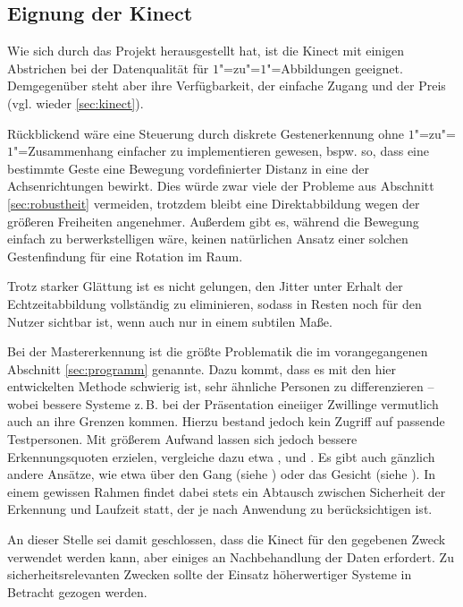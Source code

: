 \subsection{Eignung der Kinect}
Wie sich durch das Projekt herausgestellt hat, ist die Kinect mit einigen Abstrichen bei der Datenqualität für $1$"=zu"=$1$"=Abbildungen geeignet. Demgegenüber steht aber ihre Verfügbarkeit, der einfache Zugang und der Preis (vgl. wieder \ref{sec:kinect}).\par 
Rückblickend wäre eine Steuerung durch diskrete Gestenerkennung ohne $1$"=zu"=$1$"=Zusammenhang einfacher zu implementieren gewesen, bspw. so, dass eine bestimmte Geste eine Bewegung vordefinierter Distanz in eine der Achsenrichtungen bewirkt. Dies würde zwar viele der Probleme aus Abschnitt \ref{sec:robustheit} vermeiden, trotzdem bleibt eine Direktabbildung wegen der größeren Freiheiten angenehmer. Außerdem gibt es, während die Bewegung einfach zu berwerkstelligen wäre, keinen natürlichen Ansatz einer solchen Gestenfindung für eine Rotation im Raum.\par 
Trotz starker Glättung ist es nicht gelungen, den Jitter unter Erhalt der Echtzeitabbildung vollständig zu eliminieren, sodass in Resten noch für den Nutzer sichtbar ist, wenn auch nur in einem subtilen Maße.\par 
Bei der Mastererkennung ist die größte Problematik die im vorangegangenen Abschnitt \ref{sec:programm} genannte. Dazu kommt, dass es mit den hier entwickelten Methode schwierig ist, sehr ähnliche Personen zu differenzieren -- wobei bessere Systeme z.\,B. bei der Präsentation eineiiger Zwillinge vermutlich auch an ihre Grenzen kommen. Hierzu bestand jedoch kein Zugriff auf passende Testpersonen. Mit größerem Aufwand lassen sich jedoch bessere Erkennungsquoten erzielen, vergleiche dazu etwa \cite{appearance}, \cite{biomid} und \cite{bodyprop}. Es gibt auch gänzlich andere Ansätze, wie etwa über den Gang (siehe \cite{gait}) oder das Gesicht (siehe \cite{face}). In einem gewissen Rahmen findet dabei stets ein Abtausch zwischen Sicherheit der Erkennung und Laufzeit statt, der je nach Anwendung zu berücksichtigen ist.\par 
An dieser Stelle sei damit geschlossen, dass die Kinect für den gegebenen Zweck verwendet werden kann, aber einiges an Nachbehandlung der Daten erfordert. Zu sicherheitsrelevanten Zwecken sollte der Einsatz höherwertiger Systeme in Betracht gezogen werden.
%
